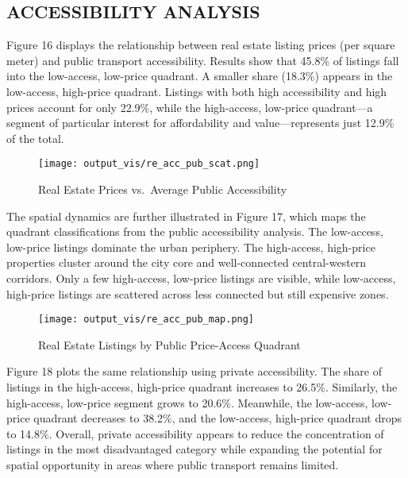 \documentclass[
  12pt,
]{report}
\begin{document}
\subsection{ACCESSIBILITY ANALYSIS}\label{accessibility-analysis}

Figure 16 displays the relationship between real estate listing prices
(per square meter) and public transport accessibility. Results show that
45.8\% of listings fall into the low-access, low-price quadrant. A
smaller share (18.3\%) appears in the low-access, high-price quadrant.
Listings with both high accessibility and high prices account for only
22.9\%, while the high-access, low-price quadrant---a segment of
particular interest for affordability and value---represents just 12.9\%
of the total.

\begin{figure}[H]

{\centering \texttt{[image: output\_vis/re\_acc\_pub\_scat.png]}

}

\caption{Real Estate Prices vs.~Average Public Accessibility}

\end{figure}%

The spatial dynamics are further illustrated in Figure 17, which maps
the quadrant classifications from the public accessibility analysis. The
low-access, low-price listings dominate the urban periphery. The
high-access, high-price properties cluster around the city core and
well-connected central-western corridors. Only a few high-access,
low-price listings are visible, while low-access, high-price listings
are scattered across less connected but still expensive zones.

\begin{figure}[H]

{\centering \texttt{[image: output\_vis/re\_acc\_pub\_map.png]}

}

\caption{Real Estate Listings by Public Price-Access Quadrant}

\end{figure}%

Figure 18 plots the same relationship using private accessibility. The
share of listings in the high-access, high-price quadrant increases to
26.5\%. Similarly, the high-access, low-price segment grows to 20.6\%.
Meanwhile, the low-access, low-price quadrant decreases to 38.2\%, and
the low-access, high-price quadrant drops to 14.8\%. Overall, private
accessibility appears to reduce the concentration of listings in the
most disadvantaged category while expanding the potential for spatial
opportunity in areas where public transport remains limited.
\end{document}
